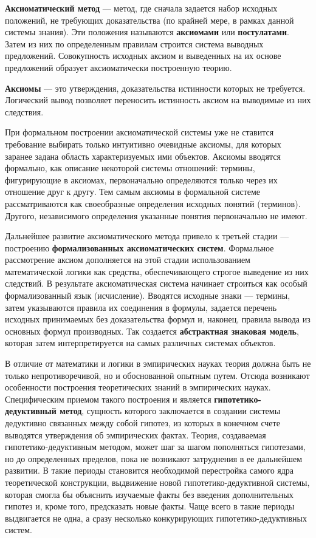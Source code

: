 \textbf{Аксиоматический метод} --- метод, где сначала задается набор исходных положений, не требующих доказательства (по крайней мере, в рамках данной системы знания). Эти положения называются \textbf{аксиомами} или \textbf{постулатами}. Затем из них по определенным правилам строится система выводных предложений. Совокупность исходных аксиом и выведенных на их основе предложений образует аксиоматически построенную теорию.

\textbf{Аксиомы} --- это утверждения, доказательства истинности которых не требуется. Логический вывод позволяет переносить истинность аксиом на выводимые из них следствия.

При формальном построении аксиоматической системы уже не ставится требование выбирать только интуитивно очевидные аксиомы, для которых заранее задана область характеризуемых ими объектов. Аксиомы вводятся формально, как описание некоторой системы отношений: термины, фигурирующие в аксиомах, первоначально определяются только через их отношение друг к другу. Тем самым аксиомы в формальной системе рассматриваются как своеобразные определения исходных понятий (терминов). Другого, независимого определения указанные понятия первоначально не имеют.

Дальнейшее развитие аксиоматического метода привело к третьей стадии --- построению \textbf{формализованных аксиоматических систем}. Формальное рассмотрение аксиом дополняется на этой стадии использованием математической логики как средства, обеспечивающего строгое выведение из них следствий. В результате аксиоматическая система начинает строиться как особый формализованный язык (исчисление). Вводятся исходные знаки --- термины, затем указываются правила их соединения в формулы, задается перечень исходных принимаемых без доказательства формул и, наконец, правила вывода из основных формул производных. Так создается \textbf{абстрактная знаковая модель}, которая затем интерпретируется на самых различных системах объектов.

В отличие от математики и логики в эмпирических науках теория должна быть не только непротиворечивой, но и обоснованной опытным путем. Отсюда возникают особенности построения теоретических знаний в эмпирических науках. Специфическим приемом такого построения и является \textbf{гипотетико-дедуктивный метод}, сущность которого заключается в создании системы дедуктивно связанных между собой гипотез, из которых в конечном счете выводятся утверждения об эмпирических фактах. Теория, создаваемая гипотетико-дедуктивным методом, может шаг за шагом пополняться гипотезами, но до определенных пределов, пока не возникают затруднения в ее дальнейшем развитии. В такие периоды становится необходимой перестройка самого ядра теоретической конструкции, выдвижение новой гипотетико-дедуктивной системы, которая смогла бы объяснить изучаемые факты без введения дополнительных гипотез и, кроме того, предсказать новые факты. Чаще всего в такие периоды выдвигается не одна, а сразу несколько конкурирующих гипотетико-дедуктивных систем.

